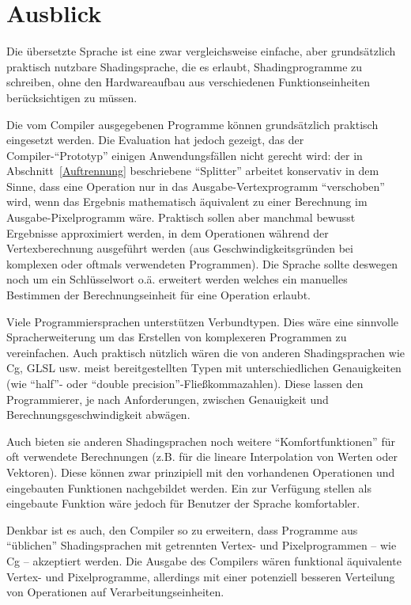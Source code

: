 \documentclass[twoside,a4paper,fleqn,12pt]{book}
\begin{document}
\chapter{Ausblick}


Die übersetzte Sprache ist eine zwar vergleichsweise einfache, aber grundsätzlich praktisch nutzbare
Shadingsprache, die es erlaubt, Shadingprogramme zu schreiben, ohne den Hardwareaufbau aus verschiedenen Funktionseinheiten
berücksichtigen zu müssen.

Die vom Compiler ausgegebenen Programme können grundsätzlich praktisch eingesetzt werden. Die Evaluation hat jedoch gezeigt,
das der Compiler-"`Prototyp"' einigen Anwendungsfällen nicht gerecht wird:
der in Abschnitt~\ref{Auftrennung} beschriebene "`Splitter"' arbeitet konservativ in dem Sinne, dass eine Operation nur in das Ausgabe-Vertexprogramm
"`verschoben"' wird, wenn das Ergebnis mathematisch äquivalent zu einer Berechnung im Ausgabe-Pixelprogramm wäre.
Praktisch sollen aber manchmal bewusst Ergebnisse approximiert werden, in dem Operationen während der Vertexberechnung ausgeführt werden
(aus Geschwindigkeitsgründen
bei komplexen oder oftmals verwendeten Programmen). Die Sprache sollte deswegen noch um ein Schlüsselwort o.ä. erweitert werden
welches ein manuelles Bestimmen der Berechnungseinheit für eine Operation erlaubt.

Viele Programmiersprachen unterstützen Verbundtypen. Dies wäre eine sinnvolle Spracherweiterung 
um das Erstellen von komplexeren Programmen zu vereinfachen. Auch praktisch nützlich wären die von anderen Shadingsprachen wie Cg, GLSL usw. meist bereitgestellten
Typen mit unterschiedlichen Genauigkeiten (wie ``half''- oder ``double precision''-Fließkommazahlen). Diese lassen den Programmierer, je nach Anforderungen,
zwischen Genauigkeit und Berechnungsgeschwindigkeit abwägen. 

Auch bieten sie anderen Shadingsprachen noch weitere "`Komfortfunktionen"' für oft verwendete
Berechnungen (z.B. für die lineare Interpolation von Werten oder Vektoren).  Diese können zwar prinzipiell mit den vorhandenen Operationen
und eingebauten Funktionen nachgebildet werden. Ein zur Verfügung stellen als eingebaute Funktion wäre jedoch für Benutzer der Sprache komfortabler.

Denkbar ist es auch, den Compiler so zu erweitern, dass Programme aus "`üblichen"' Shadingsprachen mit getrennten Vertex- und Pixelprogrammen
-- wie Cg -- akzeptiert werden. Die Ausgabe des Compilers wären funktional äquivalente Vertex- und Pixelprogramme,
allerdings mit einer potenziell besseren Verteilung von Operationen auf Verarbeitungseinheiten.
\end{document}

